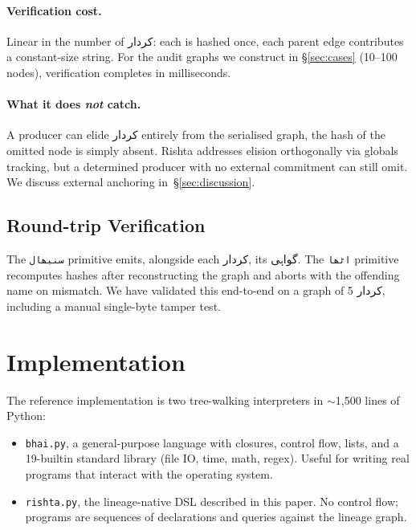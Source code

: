 \documentclass[10pt,twocolumn]{article}
\newcommand{\ur}[1]{{\urdufont #1}}
\begin{document}
\paragraph{Verification cost.} Linear in the number of \ur{کردار}: each is hashed once, each parent edge contributes a constant-size string. For the audit graphs we construct in \S\ref{sec:cases} (10--100 nodes), verification completes in milliseconds.

\paragraph{What it does \emph{not} catch.} A producer can elide \ur{کردار} entirely from the serialised graph, the hash of the omitted node is simply absent. Rishta addresses elision orthogonally via globals tracking, but a determined producer with no external commitment can still omit. We discuss external anchoring in~\S\ref{sec:discussion}.

\subsection{Round-trip Verification}

The \texttt{\ur{سنبھال}} primitive emits, alongside each \ur{کردار}, its \ur{گواہی}. The \texttt{\ur{اٹھا}} primitive recomputes hashes after reconstructing the graph and aborts with the offending name on mismatch. We have validated this end-to-end on a graph of 5 \ur{کردار}, including a manual single-byte tamper test.

\section{Implementation}
\label{sec:impl}

The reference implementation is two tree-walking interpreters in $\sim$1{,}500 lines of Python:

\begin{itemize}
\item \texttt{bhai.py}, a general-purpose language with closures, control flow, lists, and a 19-builtin standard library (file IO, time, math, regex). Useful for writing real programs that interact with the operating system.
\item \texttt{rishta.py}, the lineage-native DSL described in this paper. No control flow; programs are sequences of declarations and queries against the lineage graph.
\end{itemize}
\end{document}
